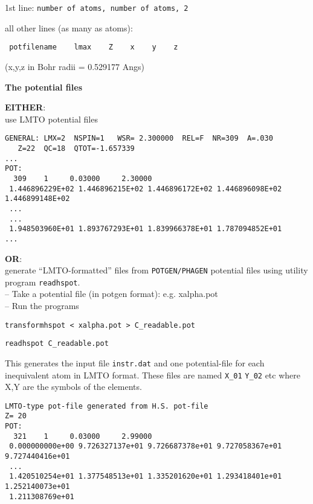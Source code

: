 \documentclass[landscape]{slides}
\newcommand{\page}{\end{slide}\begin{slide}}
\begin{document}
\begin{slide}
1st line:
{\tt number of atoms, number of atoms, 2}

all other lines (as many as atoms):
\begin{verbatim}
 potfilename    lmax    Z    x    y    z
\end{verbatim}

(x,y,z in Bohr radii = 0.529177 Angs)

\page
{\bf The potential files}  

{\bf EITHER}:\\
use LMTO potential files

\begin{small}
\begin{verbatim}
GENERAL: LMX=2  NSPIN=1   WSR= 2.300000  REL=F  NR=309  A=.030
   Z=22  QC=18  QTOT=-1.657339
...
POT:
  309    1     0.03000     2.30000
 1.446896229E+02 1.446896215E+02 1.446896172E+02 1.446896098E+02 1.446899148E+02
 ...
 ...
 1.948503960E+01 1.893767293E+01 1.839966378E+01 1.787094852E+01
...
\end{verbatim}
\end{small}

\end{slide}
\begin{slide}

{\bf OR}:\\ generate ``LMTO-formatted'' files from {\tt POTGEN/PHAGEN}
potential files using utility program {\tt readhspot}.\\
-- Take a potential file (in potgen format): e.g. xalpha.pot\\
-- Run the programs

{\tt transformhspot < xalpha.pot > C\_readable.pot}

{\tt readhspot C\_readable.pot}

This generates the input file {\tt instr.dat} and one potential-file for
each inequivalent atom in LMTO format. These files are named 
{\tt X\_01}  {\tt Y\_02} etc where X,Y are the symbols of the elements.



\begin{small}
\begin{verbatim}
LMTO-type pot-file generated from H.S. pot-file
Z= 20
POT:
  321    1     0.03000     2.99000
 0.000000000e+00 9.726327137e+01 9.726687378e+01 9.727058367e+01 9.727440416e+01
 ...
 1.420510254e+01 1.377548513e+01 1.335201620e+01 1.293418401e+01 1.252140073e+01
 1.211308769e+01
\end{verbatim}
\end{small}

\end{slide}
\end{document}
